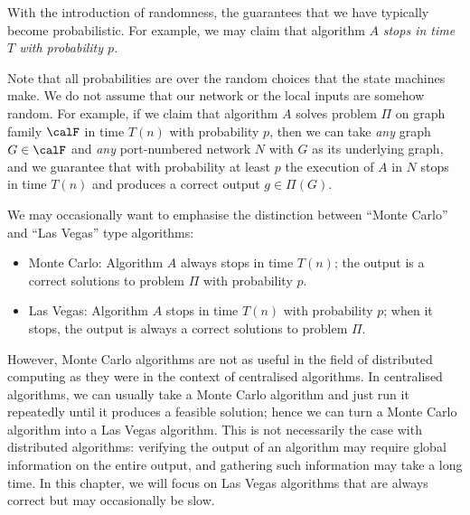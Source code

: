 With the introduction of randomness, the guarantees that we have typically become probabilistic. For example, we may claim that algorithm $A$ \emph{stops in time $T$ with probability $p$}.

Note that all probabilities are over the random choices that the state machines make. We do not assume that our network or the local inputs are somehow random. For example, if we claim that algorithm $A$ solves problem $\Pi$ on graph family $\calF$ in time $T(n)$ with probability $p$, then we can take \emph{any} graph $G \in \calF$ and \emph{any} port-numbered network $N$ with $G$ as its underlying graph, and we guarantee that with probability at least $p$ the execution of $A$ in $N$ stops in time $T(n)$ and produces a correct output $g \in \Pi(G)$.

We may occasionally want to emphasise the distinction between ``Monte Carlo'' and ``Las Vegas'' type algorithms:
\begin{itemize}
    \item Monte Carlo: Algorithm $A$ always stops in time $T(n)$; the output is a correct solutions to problem $\Pi$ with probability $p$.
    \item Las Vegas: Algorithm $A$ stops in time $T(n)$ with probability $p$; when it stops, the output is always a correct solutions to problem $\Pi$.
\end{itemize}
However, Monte Carlo algorithms are not as useful in the field of distributed computing as they were in the context of centralised algorithms. In centralised algorithms, we can usually take a Monte Carlo algorithm and just run it repeatedly until it produces a feasible solution; hence we can turn a Monte Carlo algorithm into a Las Vegas algorithm. This is not necessarily the case with distributed algorithms: verifying the output of an algorithm may require global information on the entire output, and gathering such information may take a long time. In this chapter, we will focus on Las Vegas algorithms that are always correct but may occasionally be slow.




